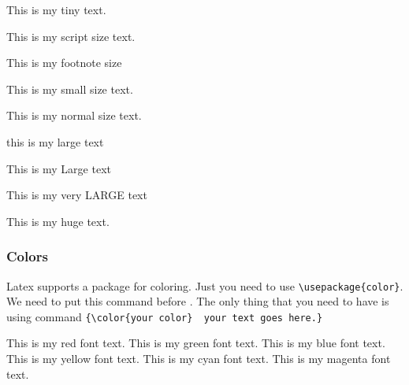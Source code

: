 {\tiny This is my tiny text. }  %

{\scriptsize This is my script size text.}

{\footnotesize  This is my footnote size} 

{\small This is my small size text.}

{\normalsize This is my normal size text.}

{\large this is my large text}

{\Large This is my Large text}

{\LARGE This is my very LARGE text}

{\huge This is my huge text.}



\subsubsection{Colors}

Latex supports a package for coloring. Just you need to use \verb|\usepackage{color}|. We need to put this command before \verb||. The only thing that you need to have is using command \verb|{\color{your color}  your text goes here.}|

{\color{red} This is my red font text}. {\color{green} This is my green font text}. {\color{blue} This is my blue font text}. {\color{yellow} This is my yellow font text}. {\color{cyan} This is my cyan font text}. {\color{magenta} This is my magenta font text}. 

